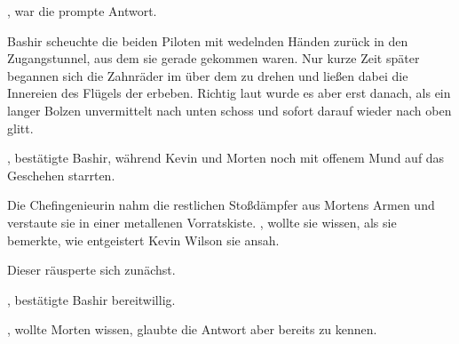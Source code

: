 , war die prompte Antwort. 

\par


\par

Bashir scheuchte die beiden Piloten mit wedelnden Händen zurück in den Zugangstunnel, aus dem sie gerade gekommen waren. Nur kurze Zeit später begannen sich die Zahnräder im über dem  zu drehen und ließen dabei die Innereien des Flügels der  erbeben. Richtig laut wurde es aber erst danach, als ein langer Bolzen unvermittelt nach unten schoss und sofort darauf wieder nach oben glitt.

\par

, bestätigte Bashir, während Kevin und Morten noch mit offenem Mund auf das Geschehen starrten. 

\par

Die Chefingenieurin nahm die restlichen Stoßdämpfer aus Mortens Armen und verstaute sie in einer metallenen Vorratskiste. , wollte sie wissen, als sie bemerkte, wie entgeistert Kevin Wilson sie ansah.

\par

Dieser räusperte sich zunächst. 

\par

, bestätigte Bashir bereitwillig. 

\par

, wollte Morten wissen, glaubte die Antwort aber bereits zu kennen.

\par

